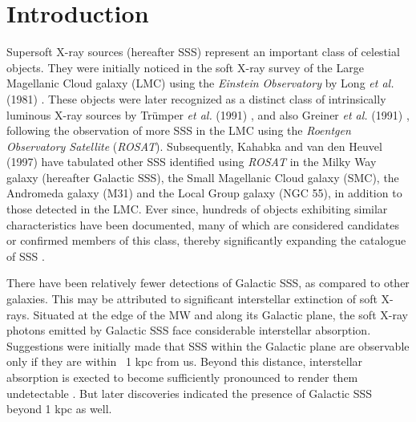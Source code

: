 \section{Introduction}
    
    Supersoft X-ray sources (hereafter SSS) represent an important class of celestial objects. They were initially noticed in the soft X-ray survey  of the Large Magellanic Cloud galaxy (LMC) using the \textit{Einstein Observatory} by Long \textit{et al.} (1981) \cite{long81}. These objects were later recognized as a distinct class of intrinsically luminous X-ray sources by Trümper \textit{et al.} (1991) \cite{trumper1991x}, and also Greiner \textit{et al.} (1991) \cite{greiner1991rosat}, following the observation of more SSS in the LMC using the \textit{Roentgen Observatory Satellite} (\textit{ROSAT}). Subsequently, Kahabka and van den Heuvel (1997) \cite{kahabka97} have tabulated other SSS identified using \textit{ROSAT} in the Milky Way galaxy (hereafter Galactic SSS), the Small Magellanic Cloud galaxy (SMC), the Andromeda galaxy (M31) and the Local Group galaxy (NGC 55), in addition to those detected in the LMC. Ever since, hundreds of objects exhibiting similar characteristics have been documented, many of which are considered candidates or confirmed members of this class, thereby significantly expanding the catalogue of SSS \cite{kahabkatrumper1996, steinerdiaz1998, greiner2000, pietsch2003deep, di2003luminous, orio2010census, henze2010recent, sturm2012new, galiullin2021populations}.
    
    There have been relatively fewer detections of Galactic SSS, as compared to other galaxies. This may be attributed to significant interstellar extinction of soft X-rays. Situated at the edge of the MW and along its Galactic plane, the soft X-ray photons emitted by Galactic SSS face considerable interstellar absorption. Suggestions were initially made that SSS within the Galactic plane are observable only if they are within ~1 kpc from us. %
    Beyond this distance, interstellar absorption is exected to become sufficiently pronounced to render them undetectable \cite{van1992accreting}. But later discoveries indicated the presence of Galactic SSS beyond 1 kpc as well.
    
